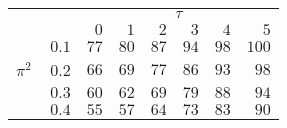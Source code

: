 \begin{tabular}{r|rrrrrr}
\hline\hline
 &\multicolumn{6}{c}{$\tau$} \\ 
  & $0$ & $1$ & $2$ & $3$ & $4$ & $5$ \\ 
 \hline$0.1$ & $ 77$ & $ 80$ & $ 87$ & $ 94$ & $ 98$ & $100$\\ 
$\pi^2\;\;\;$ $0.2$ & $ 66$ & $ 69$ & $ 77$ & $ 86$ & $ 93$ & $ 98$\\ 
$0.3$ & $ 60$ & $ 62$ & $ 69$ & $ 79$ & $ 88$ & $ 94$\\ 
$0.4$ & $ 55$ & $ 57$ & $ 64$ & $ 73$ & $ 83$ & $ 90$\\ 
 \hline 
 \end{tabular}